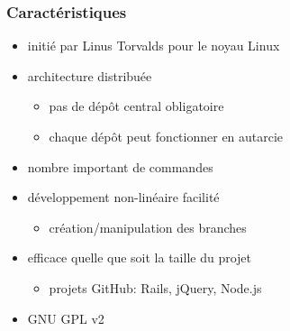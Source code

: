 
\begin{frame}\frametitle{Caractéristiques}
  \begin{itemize}
    \item initié par Linus Torvalds pour le noyau Linux
    \item architecture distribuée

      \begin{itemize}
        \item pas de dépôt central obligatoire
        \item chaque dépôt peut fonctionner en autarcie
      \end{itemize}

    \item nombre important de commandes
    \item développement non-linéaire facilité

      \begin{itemize}
        \item création/manipulation des branches
      \end{itemize}

    \item efficace quelle que soit la taille du projet

      \begin{itemize}
        \item projets GitHub: Rails, jQuery, Node.js
      \end{itemize}

    \item GNU GPL v2

  \end{itemize}
\end{frame}

